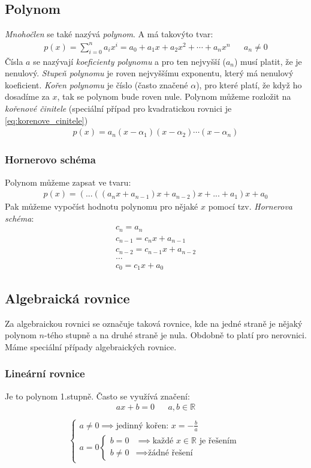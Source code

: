 \documentclass[12pt]{article}
\newcommand{\nR}{\mathbb{R}} %
\begin{document}
\subsection{Polynom}
\emph{Mnohočlen} se také nazývá \emph{polynom}. A má takovýto tvar:
\begin{align}
p(x)=\sum _{i=0}^{n}{a_{i}x^{i}}=a_{0}+a_{1}x+a_{2}x^{2}+\cdots +a_{n}x^{n} && a_n \neq 0
\end{align}
Čísla $a$ se nazývají \emph{koeficienty polynomu} a pro ten nejvyšší ($a_n$) musí platit, že je nenulový. \emph{Stupeň polynomu} je roven nejvyššímu exponentu, který má nenulový koeficient. \emph{Kořen polynomu} je číslo (často značené $\alpha$), pro které platí, že když ho dosadíme za $x$, tak se polynom bude roven nule. Polynom můžeme rozložit na \emph{kořenové činitele} (speciální případ pro kvadratickou rovnici je \eqref{eq:korenove_cinitele})
\begin{align}
p(x)=a_{n}(x-\alpha _{1})(x-\alpha _{2})\cdots (x-\alpha _{n})
\end{align}
\subsubsection{Hornerovo schéma}
Polynom můžeme zapsat ve tvaru:
\begin{align}
p(x)=(...((a_{n}x+a_{n-1})x+a_{n-2})x+...+a_{1})x+a_{0}
\end{align}
Pak můžeme vypočíst hodnotu polynomu pro nějaké $x$ pomocí tzv. \emph{Hornerova schéma}:
\begin{align*}
 c_{n}=a_{n}\\
 c_{n-1}=c_{n}x+a_{n-1}\\
 c_{n-2}=c_{n-1}x+a_{n-2}\\
\dots \\
 c_{0}=c_{1}x+a_{0}
\end{align*}
\subsection{Algebraická rovnice}
Za algebraickou rovnici se označuje taková rovnice, kde na jedné straně je nějaký polynom $n$-tého stupně a na druhé straně je nula. Obdobně to platí pro nerovnici. Máme speciální případy algebraických rovnice.
\subsubsection{Lineární rovnice}
Je to polynom 1.stupně. Často se využívá značení:
\begin{align}
ax +b = 0 && a,b \in \nR\\
\end{align}
\begin{align}
\begin{cases}
a \neq 0 \implies \text{jedinný kořen: } x = - \frac{b}{a}\\
a = 0 \begin{cases}
b =0 &\implies \text{každé $x \in \nR$ je řešením}\\
b \neq 0 &\implies \text{žádné řešení}
\end{cases}
\end{cases}
\end{align}
\end{document}
